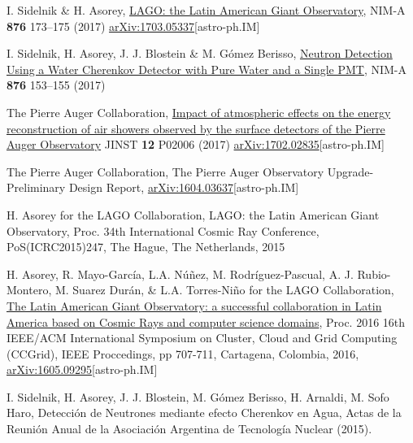 \begin{etaremune}
\item {}I. Sidelnik \& H. Asorey, \href{https://doi.org/10.1016/j.nima.2017.02.069}{{LAGO: the Latin American Giant Observatory}}, NIM-A {\bf{876}} 173--175 (2017) \href{http://arxiv.org/abs/1703.05337}{arXiv:1703.05337}[astro-ph.IM]

\item {} I. Sidelnik, H. Asorey, J. J. Blostein \& M. Gómez Berisso, \href{https://doi.org/10.1016/j.nima.2017.02.048}{{Neutron Detection Using a Water Cherenkov Detector with Pure Water and a Single PMT}}, NIM-A {\bf{876}} 153--155 (2017)

\item {}The Pierre Auger Collaboration, \href{https://doi.org/10.1088/1748-0221/12/02/P02006}{{Impact of atmospheric effects on the energy reconstruction of air showers observed by the surface detectors of the Pierre Auger Observatory}} JINST {\bf 12} P02006 (2017) \href{http://arxiv.org/abs/1702.02835}{arXiv:1702.02835}[astro-ph.IM]

\item {} The Pierre Auger Collaboration, {{The Pierre Auger Observatory Upgrade-Preliminary Design Report}}, \href{http://arxiv.org/abs/1604.03637}{arXiv:1604.03637}[astro-ph.IM]
	
\item {}H. Asorey for the LAGO Collaboration, {{LAGO: the Latin American Giant Observatory}}, \en Proc. 34th International Cosmic Ray Conference, PoS(ICRC2015)247, The Hague, The Netherlands, 2015

\item {} H. Asorey, R. Mayo-García, L.A. Núñez, M. Rodríguez-Pascual, A. J. Rubio-Montero, M. Suarez Durán, \& L.A. Torres-Niño for the LAGO Collaboration, {{\href{http://dx.doi.org/10.1109/CCGrid.2016.110}{The Latin American Giant Observatory: a successful collaboration in Latin America based on Cosmic Rays and computer science domains}}}, \en Proc. 2016 16th IEEE/ACM International Symposium on Cluster, Cloud and Grid Computing (CCGrid), IEEE Proccedings, pp 707-711, Cartagena, Colombia, 2016, \href{http://arxiv.org/abs/1605.09295}{arXiv:1605.09295}[astro-ph.IM]

\item {} I. Sidelnik, H. Asorey, J. J. Blostein, M. Gómez Berisso, H. Arnaldi, M. Sofo Haro, {{Detección de Neutrones mediante efecto Cherenkov en Agua}}, Actas de la Reunión Anual de la Asociación Argentina de Tecnología Nuclear (2015).


\end{etaremune}
